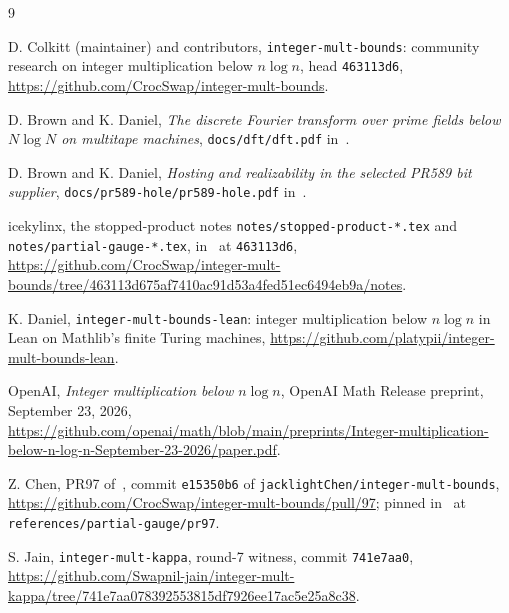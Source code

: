 \documentclass[11pt]{amsart}
\theoremstyle{remark}
\begin{document}
\begin{thebibliography}{9}\raggedright

 D. Colkitt (maintainer) and contributors, \texttt{integer-mult-bounds}: community
research on integer multiplication below $n \log n$, head \texttt{463113d6},
\url{https://github.com/CrocSwap/integer-mult-bounds}.

 D. Brown and K. Daniel, \emph{The discrete Fourier transform over prime fields below
$N \log N$ on multitape machines}, \texttt{docs/dft/dft.pdf} in~\cite{IMB}.

 D. Brown and K. Daniel, \emph{Hosting and realizability in the selected PR589 bit
supplier}, \texttt{docs/pr589-hole/pr589-hole.pdf} in~\cite{IMB}.

 icekylinx, the stopped-product notes \texttt{notes/stopped-product-*.tex} and
\texttt{notes/partial-gauge-*.tex}, in~\cite{CS} at \texttt{463113d6},
\url{https://github.com/CrocSwap/integer-mult-bounds/tree/463113d675af7410ac91d53a4fed51ec6494eb9a/notes}.

 K. Daniel, \texttt{integer-mult-bounds-lean}: integer multiplication below
$n \log n$ in Lean on Mathlib's finite Turing machines,
\url{https://github.com/platypii/integer-mult-bounds-lean}.

 OpenAI, \emph{Integer multiplication below $n \log n$}, OpenAI Math Release
preprint, September 23, 2026,
\url{https://github.com/openai/math/blob/main/preprints/Integer-multiplication-below-n-log-n-September-23-2026/paper.pdf}.

 Z. Chen, PR97 of~\cite{CS}, commit \texttt{e15350b6} of
\texttt{jacklightChen/integer-mult-bounds},
\url{https://github.com/CrocSwap/integer-mult-bounds/pull/97}; pinned in~\cite{CS} at
\texttt{references/partial-gauge/pr97}.

 S. Jain, \texttt{integer-mult-kappa}, round-7 witness, commit \texttt{741e7aa0},
\url{https://github.com/Swapnil-jain/integer-mult-kappa/tree/741e7aa078392553815df7926ee17ac5e25a8c38}.

\end{thebibliography}
\end{document}
